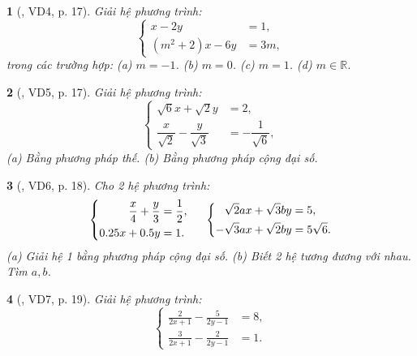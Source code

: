 \documentclass{article}
\newtheorem{baitoan}{}
\begin{document}
\begin{baitoan}[\cite{Binh_boi_duong_Toan_9_tap_2}, VD4, p. 17]
	Giải hệ phương trình:
	\begin{equation*}
		\left\{\begin{split}
			x - 2y &= 1,\\
			(m^2 + 2)x - 6y &= 3m,
		\end{split}\right.
	\end{equation*}
	trong các trường hợp: (a) $m = -1$. (b) $m = 0$. (c) $m = 1$. (d) $m\in\mathbb{R}$.
\end{baitoan}

\begin{baitoan}[\cite{Binh_boi_duong_Toan_9_tap_2}, VD5, p. 17]
	Giải hệ phương trình:
	\begin{equation*}
		\left\{\begin{split}
			\sqrt{6}x + \sqrt{2}y &= 2,\\
			\dfrac{x}{\sqrt{2}} - \dfrac{y}{\sqrt{3}} &= -\dfrac{1}{\sqrt{6}},
		\end{split}\right.
	\end{equation*}
	(a) Bằng phương pháp thế. (b) Bằng phương pháp cộng đại số.
\end{baitoan}

\begin{baitoan}[\cite{Binh_boi_duong_Toan_9_tap_2}, VD6, p. 18]
	Cho 2 hệ phương trình:
	\begin{equation*}
		\left\{\begin{split}
			\frac{x}{4} + \frac{y}{3} &= \frac{1}{2},\\
			0.25x + 0.5y &= 1.
		\end{split}\right.\hspace{5mm}
		\left\{\begin{split}
			\sqrt{2}ax + \sqrt{3}by &= 5,\\
			-\sqrt{3}ax + \sqrt{2}by &= 5\sqrt{6}.
		\end{split}\right.
	\end{equation*}
	(a) Giải hệ 1 bằng phương pháp cộng đại số. (b) Biết 2 hệ tương đương với nhau. Tìm $a,b$.
\end{baitoan}

\begin{baitoan}[\cite{Binh_boi_duong_Toan_9_tap_2}, VD7, p. 19]
	Giải hệ phương trình:
	\begin{equation*}
		\left\{\begin{split}
			\frac{2}{2x + 1} - \frac{5}{2y - 1} &= 8,\\
			\frac{3}{2x + 1} - \frac{2}{2y - 1} &= 1.
		\end{split}\right.
	\end{equation*}
\end{baitoan}
\end{document}
